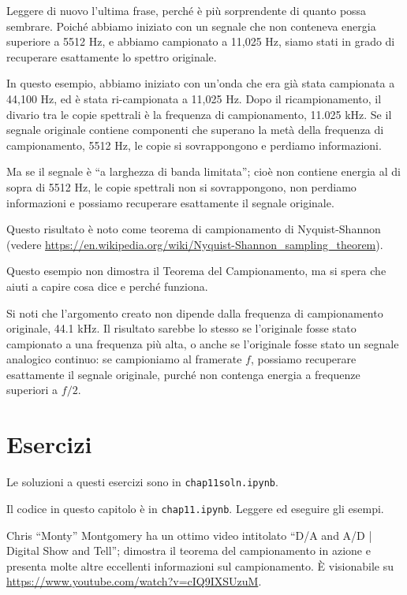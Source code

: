 \documentclass[12pt,a4paper]{book}
\begin{document}
Leggere di nuovo l'ultima frase, perché è più sorprendente di quanto possa sembrare. Poiché abbiamo iniziato con un segnale che non conteneva energia superiore a 5512 Hz, e abbiamo campionato a 11,025 Hz, siamo stati in grado di recuperare esattamente lo spettro originale.

In questo esempio, abbiamo iniziato con un'onda che era già stata campionata a 44,100 Hz, ed è stata ri-campionata a 11,025 Hz. Dopo il ricampionamento, il divario tra le copie spettrali è la frequenza di campionamento, 11.025 kHz. Se il segnale originale contiene componenti che superano la metà della frequenza di campionamento, 5512 Hz, le copie si sovrappongono e perdiamo informazioni.

Ma se il segnale è ``a larghezza di banda limitata''; cioè non contiene energia al di sopra di 5512 Hz, le copie spettrali non si sovrappongono, non perdiamo informazioni e possiamo recuperare esattamente il segnale originale.

Questo risultato è noto come teorema di campionamento di Nyquist-Shannon (vedere \url{https://en.wikipedia.org/wiki/Nyquist-Shannon_sampling_theorem}).

Questo esempio non dimostra il Teorema del Campionamento, ma si spera che aiuti a capire cosa dice e perché funziona.

Si noti che l'argomento creato non dipende dalla frequenza di campionamento originale, 44.1 kHz. Il risultato sarebbe lo stesso se l'originale fosse stato campionato a una frequenza più alta, o anche se l'originale fosse stato un segnale analogico continuo: se campioniamo al framerate $f$, possiamo recuperare esattamente il segnale originale, purché non contenga energia a frequenze superiori a $f/2$.

\section{Esercizi} 

Le soluzioni a questi esercizi sono in {\tt chap11soln.ipynb}.

\begin{exercise} Il codice in questo capitolo è in {\tt chap11.ipynb}. Leggere ed eseguire gli esempi. \end{exercise} 

\begin{exercise} Chris ``Monty'' Montgomery ha un ottimo video intitolato ``D/A and A/D | Digital Show and Tell''; dimostra il teorema del campionamento in azione e presenta molte altre eccellenti informazioni sul campionamento. È visionabile su \url{https://www.youtube.com/watch?v=cIQ9IXSUzuM}. \end{exercise} 
\end{document}
